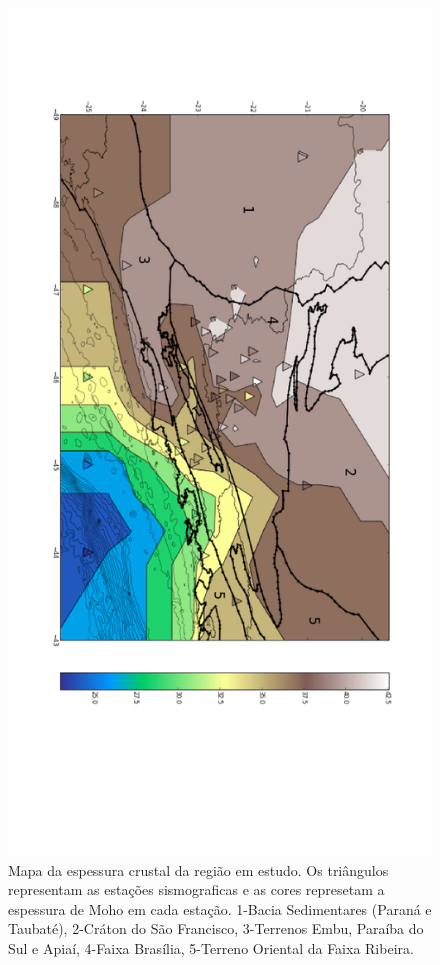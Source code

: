\begin{figure}[!ht]
\centering
\includegraphics[scale=0.6]{Figs/Interpolacao_Linear.png}
\caption[Mapa da espessura crustal da região em estudo.]{Mapa da espessura crustal da região em estudo. Os triângulos representam as estações sismograficas e as cores represetam a espessura de Moho em cada estação. 1-Bacia Sedimentares (Paraná e Taubaté), 2-Cráton do São Francisco, 3-Terrenos Embu, Paraíba do Sul e Apiaí, 4-Faixa Brasília, 5-Terreno Oriental da Faixa Ribeira.}
\label{Interpolacao}
\end{figure}

